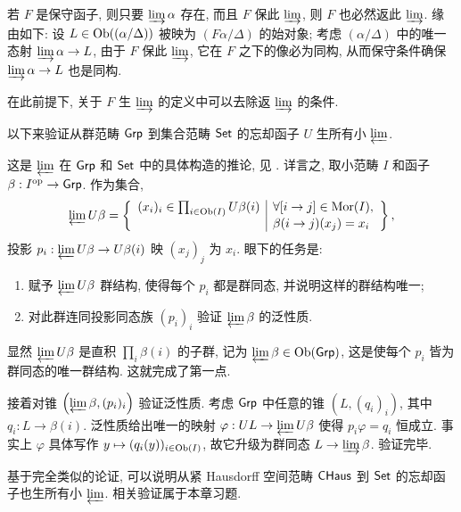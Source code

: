 \begin{remark}\label{rem:conservative-reflect}
	若 $F$ 是保守函子, 则只要 $\varinjlim \alpha$ 存在, 而且 $F$ 保此 $\varinjlim$, 则 $F$ 也必然返此 $\varinjlim$. 缘由如下: 设 $L \in \operatorname{Ob}((\alpha/\Delta))$ 被映为 $(F\alpha/\Delta)$ 的始对象; 考虑 $(\alpha/\Delta)$ 中的唯一态射 $\varinjlim \alpha \to L$, 由于 $F$ 保此 $\varinjlim$, 它在 $F$ 之下的像必为同构, 从而保守条件确保 $\varinjlim \alpha \to L$ 也是同构.
	
	在此前提下, 关于 $F$ 生 $\varinjlim$ 的定义中可以去除返 $\varinjlim$ 的条件.
\end{remark}

\begin{example}\label{eg:Grp-Set-create}
	以下来验证从群范畴 $\mathsf{Grp}$ 到集合范畴 $\mathsf{Set}$ 的忘却函子 $U$ 生所有小 $\varprojlim$.
	
	这是 $\varprojlim$ 在 $\mathsf{Grp}$ 和 $\mathsf{Set}$ 中的具体构造的推论, 见 \cite[例 2.7.5 和 2.8.7]{Li1}. 详言之, 取小范畴 $I$ 和函子 $\beta: I^{\operatorname{op}} \to \mathsf{Grp}$. 作为集合,
	\[ \varprojlim U\beta = \left\{\begin{array}{r|l}
		(x_i)_i \in \prod_{i \in \operatorname{Ob}(I)} U\beta(i) & \forall [i \to j] \in \mathrm{Mor}(I), \\
		& \beta(i \to j)(x_j) = x_i
	\end{array}\right\}, \]
	投影 $p_i: \varprojlim U\beta \to U\beta(i)$ 映 $(x_j)_j$ 为 $x_i$. 眼下的任务是:
	\begin{enumerate}
		\item 赋予 $\varprojlim U\beta$ 群结构, 使得每个 $p_i$ 都是群同态, 并说明这样的群结构唯一;
		\item 对此群连同投影同态族 $(p_i)_i$ 验证 $\varprojlim \beta$ 的泛性质. 
	\end{enumerate}

	显然 $\varprojlim U\beta$ 是直积 $\prod_i \beta(i)$ 的子群, 记为 $\varprojlim \beta \in \operatorname{Ob}(\mathsf{Grp})$, 这是使每个 $p_i$ 皆为群同态的唯一群结构. 这就完成了第一点.
	
	接着对锥 $\left( \varprojlim \beta, (p_i)_i\right)$ 验证泛性质. 考虑 $\mathsf{Grp}$ 中任意的锥 $(L, (q_i)_i)$, 其中 $q_i: L \to \beta(i)$. 泛性质给出唯一的映射 $\varphi: UL \to \varprojlim U\beta$ 使得 $p_i \varphi = q_i$ 恒成立. 事实上 $\varphi$ 具体写作 $y \mapsto (q_i(y))_{i \in \operatorname{Ob}(I)}$, 故它升级为群同态 $L \to \varinjlim \beta$. 验证完毕.
\end{example}

基于完全类似的论证, 可以说明从紧 Hausdorff 空间范畴 $\mathsf{CHaus}$ 到 $\mathsf{Set}$ 的忘却函子也生所有小 $\varprojlim$. 相关验证属于本章习题.

